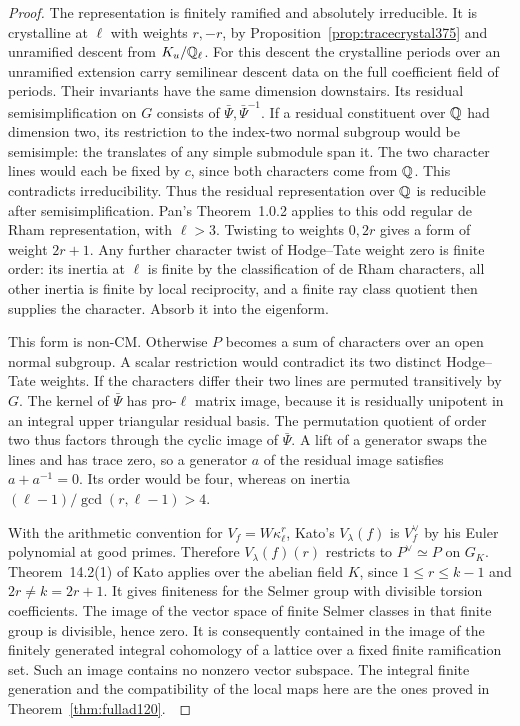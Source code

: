 \documentclass[a4paper,11pt]{article}
\theoremstyle{definition}
\theoremstyle{remark}
\numberwithin{equation}{section}
\begin{document}
\begin{proof}
The representation is finitely ramified and absolutely
irreducible. It is crystalline at \(\ell\) with weights
\(r,-r\), by Proposition~\ref{prop:tracecrystal375} and
unramified descent from \(K_u/\mathbb Q_\ell\). For this descent
the crystalline periods over an unramified extension carry
semilinear descent data on the full coefficient field of
periods. Their invariants have the same dimension downstairs.
Its residual semisimplification on \(G\) consists of
\(\bar\Psi,\bar\Psi^{-1}\). If a residual constituent over
\(\mathbb Q\) had dimension two, its restriction to the index-two
normal subgroup would be semisimple: the translates of
any simple submodule span it. The two character lines
would each be fixed by \(c\), since both characters come
from \(\mathbb Q\). This contradicts irreducibility. Thus the
residual representation over \(\mathbb Q\) is reducible after
semisimplification. Pan's Theorem~1.0.2 applies to this
odd regular de Rham representation, with \(\ell>3\).
Twisting to weights \(0,2r\) gives a form of weight \(2r+1\).
Any further character twist of Hodge--Tate weight zero is
finite order: its inertia at \(\ell\) is finite by the
classification of de Rham characters, all other inertia is
finite by local reciprocity, and a finite ray class quotient
then supplies the character. Absorb it into the eigenform.
~\cite{VII-V-VI-pan40}

This form is non-CM. Otherwise \(P\) becomes a sum of
characters over an open normal subgroup. A scalar restriction
would contradict its two distinct Hodge--Tate weights. If the
characters differ their two lines are permuted transitively
by \(G\). The kernel of \(\bar\Psi\) has pro-\(\ell\) matrix
image, because it is residually unipotent in an integral
upper triangular residual basis. The permutation quotient
of order two thus factors through the cyclic image of
\(\bar\Psi\). A lift of a generator swaps the lines and
has trace zero, so a generator \(a\) of the residual
image satisfies \(a+a^{-1}=0\). Its order would be four,
whereas on inertia \((\ell-1)/\gcd(r,\ell-1)>4\).

With the arithmetic convention for \(V_f=W\kappa_\ell^r\),
Kato's \(V_\lambda(f)\) is \(V_f^\vee\) by his Euler
polynomial at good primes. Therefore \(V_\lambda(f)(r)\)
restricts to \(P^\vee\simeq P\) on \(G_K\).
Theorem~14.2(1) of Kato applies over the abelian field \(K\),
since \(1\le r\le k-1\) and \(2r\ne k=2r+1\). It gives
finiteness for the Selmer group with divisible torsion
coefficients. The image of the vector space of finite
Selmer classes in that finite group is divisible, hence zero.
It is consequently contained in the image of the finitely
generated integral cohomology of a lattice over a fixed finite
ramification set. Such an image contains no nonzero vector
subspace. The integral finite generation and the compatibility
of the local maps here are the ones proved in
Theorem~\ref{thm:fullad120}.~\cite{VII-V-VI-kato120}
\end{proof}
\end{document}
